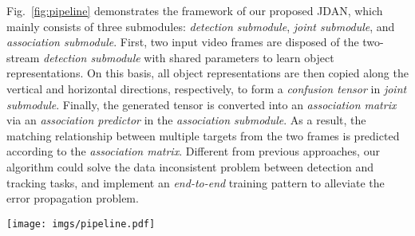 \documentclass[acmsmall]{acmart}
\begin{document}
{
Fig.~\ref{fig:pipeline} demonstrates the framework of our proposed JDAN,
which mainly consists of three submodules: \emph{detection submodule}, \emph{joint submodule}, and \emph{association submodule}.
First, two input video frames are disposed of the two-stream \emph{detection submodule} with shared parameters to learn object representations. 
On this basis, all object representations are then copied along the vertical and horizontal directions, respectively, to form a \emph{confusion tensor} in \emph{joint submodule}. 
Finally, the generated tensor is converted into an \emph{association matrix} via an \emph{association predictor} in the \emph{association submodule}. 
As a result, the matching relationship between multiple targets from the two frames is predicted according to the \emph{association matrix}.
Different from previous approaches, our algorithm could solve the data inconsistent problem between detection and tracking tasks, and implement an \emph{end-to-end} training pattern to alleviate the error propagation problem. 
} 


\begin{figure*}
	\centering
	\texttt{[image: imgs/pipeline.pdf]}
	\caption{
		{An illustration to the framework of our Joint Detection Association Network (JDAN), which consists of three submodules: \emph{detection submodule} $S_D$, \emph{joint submodule} $S_J$, and \emph{association submodule} $S_A$.} 
	}
	\label{fig:pipeline}
\end{figure*}
\end{document}
